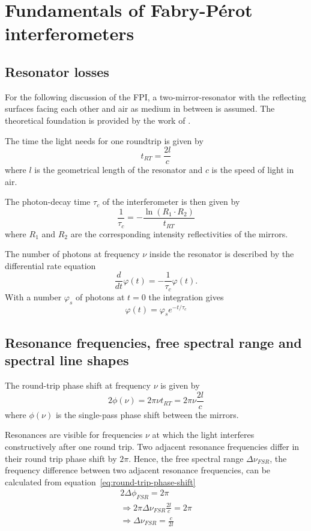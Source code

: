 \section{Fundamentals of Fabry-Pérot interferometers}


\subsection{Resonator losses}
For the following discussion of the \ac{FPI}, a two-mirror-resonator with the reflecting surfaces facing each other and air as medium in between is assumed.
The theoretical foundation is provided by the work of \textcite{ismail_fabry-perot_2016}.

The time the light needs for one roundtrip is given by
\begin{equation}
t_{RT} = \frac{2l}{c}
\end{equation}
where $l$ is the geometrical length of the resonator and $c$ is the speed of light in air. 

The photon-decay time $\tau_c$ of the interferometer is then given by
\begin{equation}
\frac{1}{\tau_c} = - \frac{\ln(R_1 \cdot R_2)}{t_{RT}}
\end{equation}
where $R_1$ and $R_2$ are the corresponding intensity reflectivities of the mirrors.

The number of photons at frequency $\nu$ inside the resonator is described by the differential rate equation
\begin{equation}
\frac{d}{dt} \varphi(t) = - \frac{1}{\tau_c}\varphi(t).
\end{equation}
With a number $\varphi_s$ of photons at $t=0$ the integration gives
\begin{equation}
\label{eq:photon-decay}
\varphi(t)=\varphi_s e^{-t/\tau_c}
\end{equation}

\subsection{Resonance frequencies, free spectral range and spectral line shapes}
The round-trip phase shift at frequency $\nu$ is given by 
\begin{equation}
\label{eq:round-trip-phase-shift-phi}
2 \phi(\nu) = 2 \pi \nu t_{RT} = 2 \pi \nu \frac{2l}{c}
\end{equation}
where $\phi(\nu)$ is the single-pass phase shift between the mirrors.

Resonances are visible for frequencies $\nu$ at which the light interferes constructively after one round trip.
Two adjacent resonance frequencies differ in their round trip phase shift by $2 \pi$.
Hence, the free spectral range $\Delta \nu_{FSR}$, the frequency difference between two adjacent resonance frequencies, can be calculated from equation~\eqref{eq:round-trip-phase-shift}
\begin{align}
2\Delta\phi_{FSR} = 2\pi \\
\Rightarrow 2\pi\Delta\nu_{FSR}\frac{2l}{c} = 2\pi\\
\label{eq:free-spectral-range}
\Rightarrow \Delta\nu_{FSR} = \frac{c}{2l}
\end{align}


